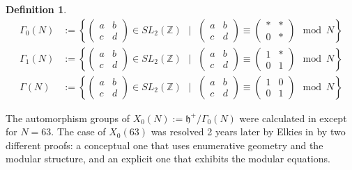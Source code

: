 \documentclass[12pt,reqno]{amsart}
\newcommand{\Z}{\mathbb{Z}}
\theoremstyle{definition}
\newtheorem{defn}{Definition}
\theoremstyle{remark}
\begin{document}
\begin{defn} 
\begin{align*} 
\Gamma_0(N) &:= \left\{ \begin{pmatrix} a & b \\ c & d \end{pmatrix} \in SL_2(\Z) \text{ }  \Big| \text{ } \begin{pmatrix} a & b \\ c & d \end{pmatrix} \equiv  \begin{pmatrix} * & * \\ 0 & * \end{pmatrix} \mod N \right\} \\
\Gamma_1(N) &:= \left\{ \begin{pmatrix} a & b \\ c & d \end{pmatrix} \in SL_2(\Z) \text{ }  \Big| \text{ }  \begin{pmatrix} a & b \\ c & d \end{pmatrix} \equiv  \begin{pmatrix} 1 & * \\ 0 & 1 \end{pmatrix} \mod N \right\} \\
\Gamma(N) &:= \left\{ \begin{pmatrix} a & b \\ c & d \end{pmatrix} \in SL_2(\Z) \text{ }  \Big| \text{ }  \begin{pmatrix} a & b \\ c & d \end{pmatrix} \equiv  \begin{pmatrix} 1 & 0 \\ 0 & 1 \end{pmatrix} \mod N \right\}
\end{align*}
 \end{defn} 

The automorphism groups of $X_0(N) := \mathfrak{h}^{+} / \Gamma_0(N)$ were calculated in \cite{km} except for $N=63$. The case of $X_0(63)$ was resolved 2 years later by Elkies in \cite{elkies} by two different proofs: a conceptual one that uses enumerative geometry and the modular structure, and an explicit one that exhibits the modular equations. 
\end{document}

